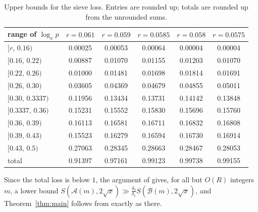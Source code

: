\documentclass[11pt]{amsart}
\theoremstyle{definition}
\theoremstyle{remark}
\newcommand{\rz}{\RZERO}
\newcommand{\RZERO}{0.0575}
\newcommand{\LOSS}{\LOSSVAL}
\newcommand{\LOSSVAL}{0.99155}
\begin{document}
\begin{table}[ht]
\centering
\begin{tabular}{lccccc}
\toprule
range of $\log_x p$ & $r=0.061$ & $r=0.059$ & $r=0.0585$ & $r=0.058$ & $r=\rz$\\
\midrule
$[r,\,0.16)$ & 0.00025 & 0.00053 & 0.00064 & 0.00004 & 0.00004\\
$[0.16,\,0.22)$ & 0.00887 & 0.01070 & 0.01155 & 0.01203 & 0.01070\\
$[0.22,\,0.26)$ & 0.01000 & 0.01481 & 0.01698 & 0.01814 & 0.01691\\
$[0.26,\,0.30)$ & 0.03605 & 0.04369 & 0.04679 & 0.04855 & 0.05011\\
$[0.30,\,0.3337)$ & 0.11956 & 0.13434 & 0.13731 & 0.14142 & 0.13848\\
$[0.3337,\,0.36)$ & 0.15231 & 0.15552 & 0.15830 & 0.15696 & 0.15760\\
$[0.36,\,0.39)$ & 0.16113 & 0.16581 & 0.16711 & 0.16832 & 0.16808\\
$[0.39,\,0.43)$ & 0.15523 & 0.16279 & 0.16594 & 0.16730 & 0.16914\\
$[0.43,\,0.5)$ & 0.27063 & 0.28345 & 0.28663 & 0.28467 & 0.28053\\
\midrule
total & 0.91397 & 0.97161 & 0.99123 & 0.99738 & \LOSS\\
\bottomrule
\end{tabular}
\caption{Upper bounds for the sieve loss. Entries are rounded up; totals are rounded up from the unrounded sums.}\label{tab:loss}
\end{table}

Since the total loss is below $1$, the argument of \cite[Sections~3 and~7]{J} gives, for all but $O(R)$ integers $m$, a lower bound $S(\mathcal A(m),2\sqrt x)\gg \frac{\delta_0}{\delta_1}S(\mathcal B(m),2\sqrt x)$, and Theorem~\ref{thm:main} follows from \cite[Lemma~3.1]{J} exactly as there.
\end{document}
